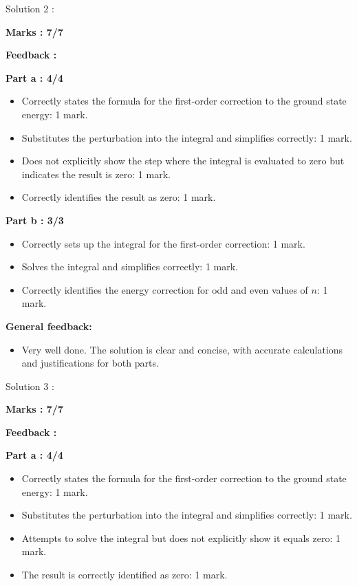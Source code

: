 \documentclass[a4paper,11pt]{article}
\begin{document}
Solution 2 :

\textbf{Marks : 7/7}

\textbf{Feedback :}

\textbf{Part a : 4/4}

\begin{itemize}
    \item Correctly states the formula for the first-order correction to the ground state energy: 1 mark.
    \item Substitutes the perturbation into the integral and simplifies correctly: 1 mark.
    \item Does not explicitly show the step where the integral is evaluated to zero but indicates the result is zero: 1 mark.
    \item Correctly identifies the result as zero: 1 mark.
\end{itemize}


\textbf{Part b : 3/3}

\begin{itemize}
    \item Correctly sets up the integral for the first-order correction: 1 mark.
    \item Solves the integral and simplifies correctly: 1 mark.
    \item Correctly identifies the energy correction for odd and even values of $n$: 1 mark.
\end{itemize}

\textbf{General feedback:}

\begin{itemize}
    \item Very well done. The solution is clear and concise, with accurate calculations and justifications for both parts.
\end{itemize}



Solution 3 :

\textbf{Marks : 7/7}

\textbf{Feedback :}

\textbf{Part a : 4/4}

\begin{itemize}
    \item Correctly states the formula for the first-order correction to the ground state energy: 1 mark.
    \item Substitutes the perturbation into the integral and simplifies correctly: 1 mark.
    \item Attempts to solve the integral but does not explicitly show it equals zero: 1 mark.
    \item The result is correctly identified as zero: 1 mark.
\end{itemize}
\end{document}
